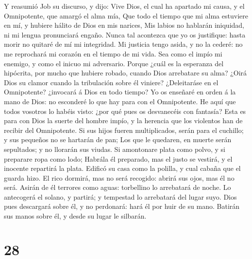  Y reasumió Job su discurso, y dijo:  Vive Dios,
el cual ha apartado mi causa, y el Omnipotente, que amargó el alma mía,
 Que todo el tiempo que mi alma estuviere en mí, y hubiere
hálito de Dios en mis narices,  Mis labios no hablarán
iniquidad, ni mi lengua pronunciará engaño.  Nunca tal
acontezca que yo os justifique: hasta morir no quitaré de mí mi
integridad.  Mi justicia tengo asida, y no la cederé: no me
reprochará mi corazón en el tiempo de mi vida.  Sea como el
impío mi enemigo, y como el inicuo mi adversario.  Porque
¿cuál es la esperanza del hipócrita, por mucho que hubiere robado,
cuando Dios arrebatare su alma?  ¿Oirá Dios su clamor cuando
la tribulación sobre él viniere?  ¿Deleitaráse en el
Omnipotente? ¿invocará á Dios en todo tiempo?  Yo os
enseñaré en orden á la mano de Dios: no esconderé lo que hay para con el
Omnipotente.  He aquí que todos vosotros lo habéis visto:
¿por qué pues os desvanecéis con fantasía?  Esta es para
con Dios la suerte del hombre impío, y la herencia que los violentos han
de recibir del Omnipotente.  Si sus hijos fueren
multiplicados, serán para el cuchillo; y sus pequeños no se hartarán de
pan;  Los que le quedaren, en muerte serán sepultados; y no
llorarán sus viudas.  Si amontonare plata como polvo, y si
preparare ropa como lodo;  Habrála él preparado, mas el
justo se vestirá, y el inocente repartirá la plata. 
Edificó su casa como la polilla, y cual cabaña que el guarda hizo.
 El rico dormirá, mas no será recogido: abrirá sus ojos,
mas él no será.  Asirán de él terrores como aguas:
torbellino lo arrebatará de noche.  Lo antecogerá el
solano, y partirá; y tempestad lo arrebatará del lugar suyo.
 Dios pues descargará sobre él, y no perdonará: hará él por
huir de su mano.  Batirán sus manos sobre él, y desde su
lugar le silbarán.

\hypertarget{section-27}{%
\section{28}\label{section-27}}

